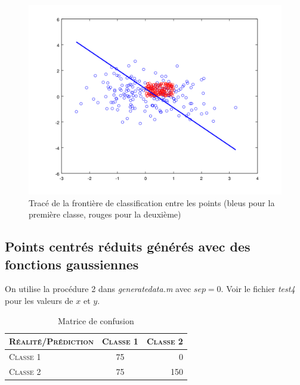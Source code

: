 \documentclass{article}
\begin{document}
         \begin{figure}
           \begin{center}
             \subfigure\includegraphics[scale=0.3]{images/line2D3.png}
             \caption{Tracé de la frontière de classification entre les points (bleus pour la première classe, rouges pour la deuxième)}
           \end{center}
         \end{figure}

\subsection{Points centrés réduits générés avec des fonctions gaussiennes}

On utilise la procédure 2 dans \emph{generatedata.m} avec $sep=0$. Voir le fichier \emph{test4} pour les valeurs de $x$ et $y$.

     \begin{table}[H]
       \caption{Matrice de confusion}
       \begin{tabular}{|l|c|r|}
         \hline
         \textsc{Réalité/Prédiction} & \textsc{Classe 1} & \textsc{Classe 2}\\
         \hline
         \textsc{Classe 1} & 75 & 0\\
         \hline
         \textsc{Classe 2} & 75 & 150\\
         \hline
       \end{tabular}
     \end{table}
\end{document}

